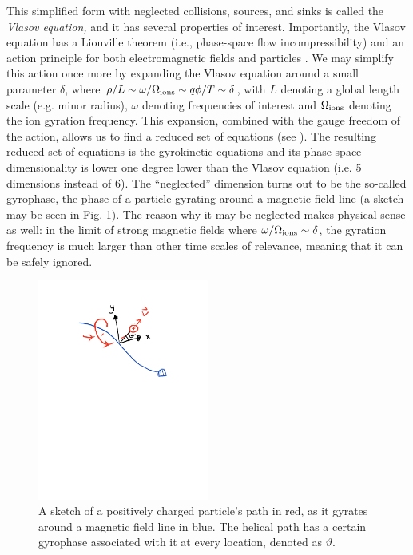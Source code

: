 This simplified form with neglected collisions, sources, and sinks is called the \textit{Vlasov equation,} and it has several properties of interest. Importantly, the Vlasov equation has a Liouville theorem (i.e., phase-space flow incompressibility) and an action principle for both electromagnetic fields and particles \cite{landau2013classical}. We may simplify this action once more by expanding the Vlasov equation around a small parameter $\delta$, where $\rho/L\sim \omega/\Omega_{\rm ions} \sim q \phi / T \sim \delta $, with $L$ denoting a global length scale (e.g. minor radius), $\omega$ denoting frequencies of interest and $\Omega_{\rm ions}$ denoting the ion gyration frequency. This expansion, combined with the gauge freedom of the action, allows us to find a reduced set of equations (see \citet{scott2017gyrokinetic}). The resulting reduced set of equations is the gyrokinetic equations and its phase-space dimensionality is lower one degree lower than the Vlasov equation (i.e. 5 dimensions instead of 6). The ``neglected'' dimension turns out to be the so-called gyrophase, the phase of a particle gyrating around a magnetic field line (a sketch may be seen in Fig. \ref{fig: gyrophase sketch}). The reason why it may be neglected makes physical sense as well: in the limit of strong magnetic fields where $\omega/\Omega_{\rm ions} \sim \delta$, the gyration frequency is much larger than other time scales of relevance, meaning that it can be safely ignored. \par
\begin{figure}
    \centering
    \includegraphics[width=0.5\textwidth]{3_chapters/0_introduction/img/gyrophase-sketch.pdf}
    \caption{A sketch of a positively charged particle's path in red, as it gyrates around a magnetic field line in blue. The helical path has a certain gyrophase associated with it at every location, denoted as $\vartheta$.}
    \label{fig: gyrophase sketch}
\end{figure}


